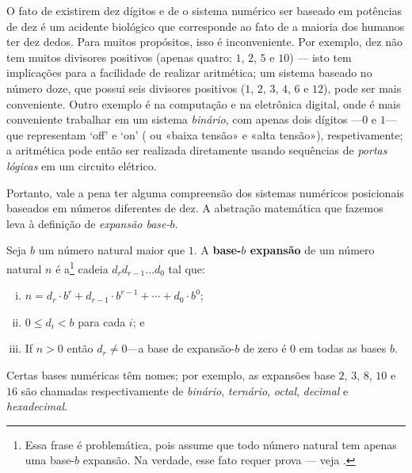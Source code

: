 O fato de existirem dez dígitos e de o sistema numérico ser baseado em potências de dez é um acidente biológico que corresponde ao fato de a maioria dos humanos ter dez dedos. Para muitos propósitos, isso é inconveniente. Por exemplo, dez não tem muitos divisores positivos (apenas quatro: $1$, $2$, $5$ e $10$) --- isto tem implicações para a facilidade de realizar aritmética; um sistema baseado no número doze, que possui seis divisores positivos ($1$, $2$, $3$, $4$, $6$ e $12$), pode ser mais conveniente. Outro exemplo é na computação e na eletrônica digital, onde é mais conveniente trabalhar em um sistema \textit{binário}, com apenas dois dígitos ---$0$ e $1$---que representam `off' e `on' ( ou «baixa tensão» e «alta tensão»), respetivamente; a aritmética pode então ser realizada diretamente usando sequências de \textit{portas lógicas} em um circuito elétrico.

Portanto, vale a pena ter alguma compreensão dos sistemas numéricos posicionais baseados em números diferentes de dez. A abstração matemática que fazemos leva à definição de \textit{expansão base-$b$}.

\begin{definition}
\label{defBaseBExpansionPreliminary}
Seja $b$ um número natural maior que $1$. A \textbf{base-$b$ expansão} de um número natural $n$ é a\footnote{Essa frase é problemática, pois assume que todo número natural tem apenas uma base-$b$ expansão. Na verdade, esse fato requer prova --- veja .} cadeia $d_r d_{r-1} \dots d_0$ tal que:

\begin{enumerate}[(i)]
\item $n = d_r \cdot b^r + d_{r-1} \cdot b^{r-1} + \cdots + d_0 \cdot b^0$;
\item $0 \le d_i < b$ para cada $i$; e
\item If $n>0$ então $d_r \ne 0$---a base de expansão-$b$ de zero é $0$ em todas as bases $b$.
\end{enumerate}
Certas bases numéricas têm nomes; por exemplo, as expansões base $2$, $3$, $8$, $10$ e $16$ são chamadas respectivamente de \textit{binário}, \textit{ternário}, \textit{octal}, \textit{decimal} e \textit {hexadecimal}.
\end{definition}

